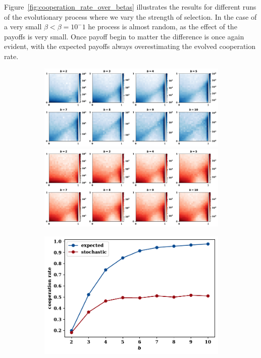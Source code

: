 \documentclass[11pt]{article}
\theoremstyle{plainCl1}
\theoremstyle{plainCl2}
\begin{document}
Figure~\ref{fig:cooperation_rate_over_betas} illustrates the results for
different runs of the evolutionary process where we vary the strength of
selection. In the case of a very small \(\beta < \beta=10 ^ -1\) he process is
almost random, as the effect of the payoffs is very small. Once payoff begin to
matter the difference is once again evident, with the expected payoffs always
overestimating the evolved cooperation rate.

\begin{figure}[!htbp]
  \centering
  \begin{subfigure}{.5\textwidth}
    \centering
    \includegraphics[width=\textwidth]{static/expected_for_beta.pdf}
    \includegraphics[width=\textwidth]{static/stochastic_for_beta.pdf}
  \end{subfigure}%
  \begin{subfigure}{.5\textwidth}
    \centering
    \includegraphics[width=\textwidth]{static/cooperation_rate_over_b.pdf}

\end{subfigure}
\end{figure}
\end{document}
